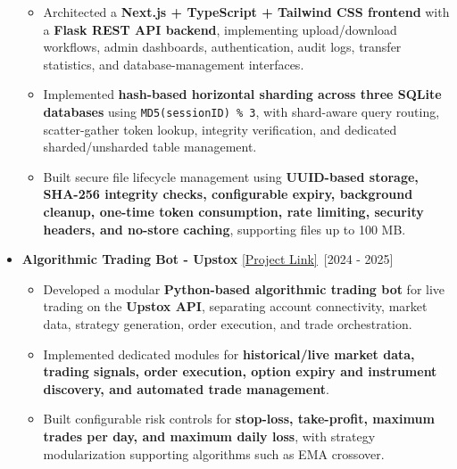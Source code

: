 \documentclass[a4paper,10pt]{article}
\newcommand{\isep}{-2 pt}
\begin{document}
\begin{itemize}
\begin{itemize}
        \item Architected a \textbf{Next.js + TypeScript + Tailwind CSS frontend} with a \textbf{Flask REST API backend}, implementing upload/download workflows, admin dashboards, authentication, audit logs, transfer statistics, and database-management interfaces.

        \item Implemented \textbf{hash-based horizontal sharding across three SQLite databases} using \texttt{MD5(sessionID) \% 3}, with shard-aware query routing, scatter-gather token lookup, integrity verification, and dedicated sharded/unsharded table management.

        \item Built secure file lifecycle management using \textbf{UUID-based storage, SHA-256 integrity checks, configurable expiry, background cleanup, one-time token consumption, rate limiting, security headers, and no-store caching}, supporting files up to 100 MB.

    \end{itemize}



    \item \textbf{Algorithmic Trading Bot - Upstox} \underline{\href{https://github.com/devvrat-hans/algo-trading-bot}{[Project Link]}}\ \hfill [2024 - 2025]\\[-0.7cm]

    \begin{itemize}\itemsep \isep

        \item Developed a modular \textbf{Python-based algorithmic trading bot} for live trading on the \textbf{Upstox API}, separating account connectivity, market data, strategy generation, order execution, and trade orchestration.

        \item Implemented dedicated modules for \textbf{historical/live market data, trading signals, order execution, option expiry and instrument discovery, and automated trade management}.

        \item Built configurable risk controls for \textbf{stop-loss, take-profit, maximum trades per day, and maximum daily loss}, with strategy modularization supporting algorithms such as EMA crossover.


\end{itemize}
\end{itemize}
\end{document}
